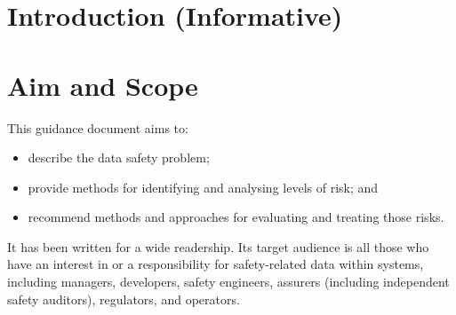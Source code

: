 %
%

%
%
\setcounter{page}{1}
\pagestyle{Standard} %
\thispagestyle{FirstPage}

\section{Introduction (Informative)} \label{bkm:introduction}


\section{Aim and Scope}
This guidance document aims to:
\begin{itemize}
	\item describe the data safety problem;
	\item provide methods for identifying and analysing levels of risk; and
	\item recommend methods and approaches for evaluating and treating those risks.
\end{itemize}

It has been written for a wide readership. Its target audience is all those who have an interest in or a responsibility for safety-related data within systems, including managers, developers, safety engineers, assurers (including independent safety auditors), regulators, and operators. 

